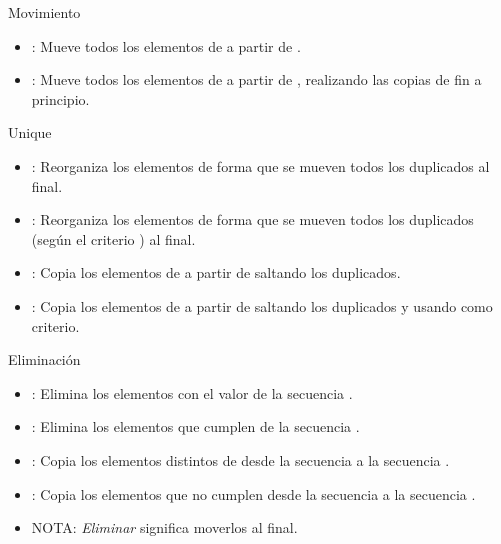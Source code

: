 \begin{frame}[t]{Movimiento}
\begin{itemize}
  \item {}: Mueve todos los elementos de \cppid{[i,f)} 
        a partir de .
  \item {}: Mueve todos los elementos de \cppid{[i,f)} 
        a partir de ,
        realizando las copias de fin a principio.
\end{itemize}
\end{frame}

\begin{frame}[t]{Unique}
\begin{itemize}
  \item {}: Reorganiza los elementos de forma que se mueven 
        todos los duplicados al final.
  \item {}:  Reorganiza los elementos de forma que se mueven 
        todos los duplicados (según el criterio ) al final.
  \item {}: Copia los elementos de \cppid{[i,f)}
        a partir de  saltando los duplicados.
  \item {}: Copia los elementos de \cppid{[i,f)}
        a partir de  saltando los duplicados y usando  como criterio.
\end{itemize}
\end{frame}

\begin{frame}[t]{Eliminación}
\begin{itemize}
  \item {}: Elimina los elementos con el valor  de la secuencia \cppid{[i,f)}.
  \item {}: Elimina los elementos que cumplen  de la secuencia \cppid{[i,f)}.
  \item {}: Copia los elementos distintos de  desde la secuencia \cppid{[i,f)}
        a la secuencia \cppid{[o,o+(f-i))}.
  \item {}: Copia los elementos que no cumplen  desde la secuencia \cppid{[i,f)}
        a la secuencia \cppid{[o,o+(f-i))}.
  \vfill
  \item \alert{NOTA}: \emph{Eliminar} significa moverlos al final.
\end{itemize}
\end{frame}

